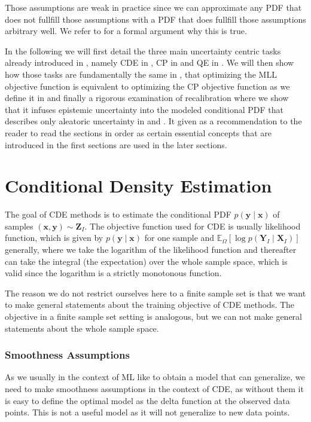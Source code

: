 Those assumptions are weak in practice since we can approximate any PDF that does not fullfill those assumptions with a PDF that does fullfill those assumptions arbitrary well. We refer to \cite{klenke2013probability} for a formal argument why this is true.

In the following we will first detail the three main uncertainty centric tasks already introduced in , namely CDE in , CP in  and QE in . We will then show how those tasks are fundamentally the same in , that optimizing the MLL objective function is equivalent to optimizing the CP objective function as we define it in  and finally a rigorous examination of recalibration where we show that it infuses epistemic uncertainty into the modeled conditional PDF that describes only aleatoric uncertainty in  and . It given as a recommendation to the reader to read the sections in order as certain essential concepts that are introduced in the first sections are used in the later sections.

\section{Conditional Density Estimation}\label{sec:cde}

The goal of CDE methods is to estimate the conditional PDF $p(\mathbf{y}\mid \mathbf{x})$ of samples $(\mathbf{x}, \mathbf{y}) \sim \mathbf{Z}_I$. The objective function used for CDE is usually likelihood function, which is given by $p(\mathbf{y}\mid \mathbf{x})$ for one sample and $\mathbb{E}_{\Omega}\left[\log p(\mathbf{Y}_I \mid \mathbf{X}_I)\right]$ generally, where we take the logarithm of the likelihood function and thereafter can take the integral (the expectation) over the whole sample space, which is valid since the logarithm is a strictly monotonous function.

The reason we do not restrict ourselves here to a finite sample set is that we want to make general statements about the training objective of CDE methods. The objective in a finite sample set setting is analogous, but we can not make general statements about the whole sample space. %

\subsubsection{Smoothness Assumptions}\label{sec:smoothness}
As we usually in the context of ML like to obtain a model that can generalize, we need to make smoothness assumptions in the context of CDE, as without them it is easy to define the optimal model as the delta function at the observed data points. This is not a useful model as it will not generalize to new data points.

